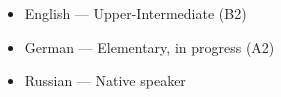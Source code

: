\begin{itemize}
\item English — Upper-Intermediate (B2)
\item German — Elementary, in progress (A2)
\item Russian — Native speaker
\end{itemize}
